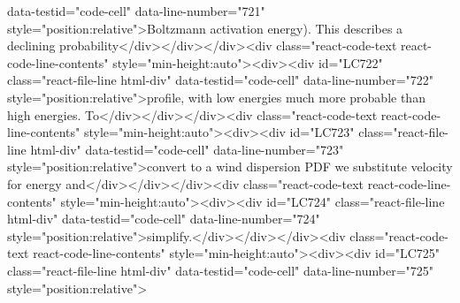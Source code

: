 {{{{{data-testid="code-cell" data-line-number="721" style="position:relative">Boltzmann activation energy). This describes a declining probability</div></div></div><div class="react-code-text react-code-line-contents" style="min-height:auto"><div><div id="LC722" class="react-file-line html-div" data-testid="code-cell" data-line-number="722" style="position:relative">profile, with low energies much more probable than high energies. To</div></div></div><div class="react-code-text react-code-line-contents" style="min-height:auto"><div><div id="LC723" class="react-file-line html-div" data-testid="code-cell" data-line-number="723" style="position:relative">convert to a wind dispersion PDF we substitute velocity for energy and</div></div></div><div class="react-code-text react-code-line-contents" style="min-height:auto"><div><div id="LC724" class="react-file-line html-div" data-testid="code-cell" data-line-number="724" style="position:relative">simplify.</div></div></div><div class="react-code-text react-code-line-contents" style="min-height:auto"><div><div id="LC725" class="react-file-line html-div" data-testid="code-cell" data-line-number="725" style="position:relative">
}}}}}
